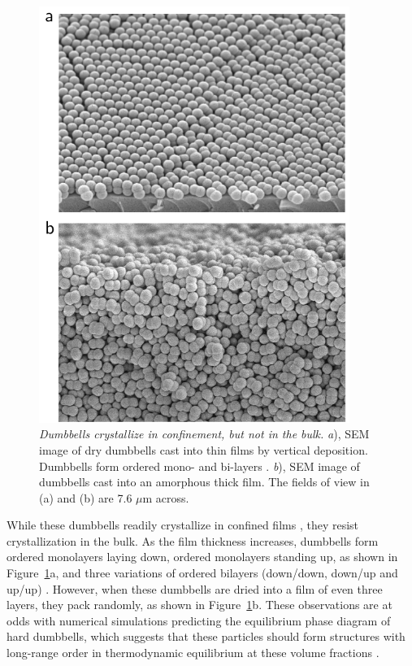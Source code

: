 \begin{figure}[htbp]
\centering
\includegraphics[width=0.9\textwidth]{figures/CFigure1.pdf}
\caption{\label{fig:assembly} \emph{Dumbbells crystallize in confinement, but not in the bulk.}
	\emph{a}), SEM image of dry dumbbells cast into thin films by vertical deposition. Dumbbells form ordered mono- and bi-layers \cite{Park2010}.
	\emph{b}), SEM image of dumbbells cast into an amorphous thick film. The fields of view in (a) and (b) are 7.6 $\mu$m across.}
\end{figure}

While these dumbbells  readily crystallize in confined films \cite{Park2010}, they resist crystallization in the bulk.
As the film thickness increases, dumbbells form ordered monolayers laying down, ordered monolayers standing up, as shown in Figure~\ref{fig:assembly}a, and three variations of ordered bilayers (down/down, down/up and up/up) \cite{Park2010}.
However, when these dumbbells are dried into a film of even three layers, they pack randomly, as shown in Figure~\ref{fig:assembly}b.
These observations are at odds with numerical simulations predicting the equilibrium phase diagram of hard dumbbells, which suggests that these particles should form structures with long-range order in thermodynamic equilibrium at these volume fractions  \cite{Vega1992}.


